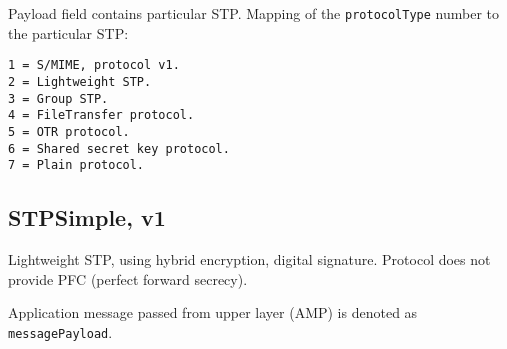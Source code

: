 \documentclass[a4paper,10pt]{article}
\begin{document}
Payload field contains particular STP. Mapping of the \verb#protocolType# number to the particular STP:\\
\begin{Verbatim}[frame=single]
1 = S/MIME, protocol v1.
2 = Lightweight STP.
3 = Group STP.
4 = FileTransfer protocol.
5 = OTR protocol.
6 = Shared secret key protocol.
7 = Plain protocol.
\end{Verbatim} 

\subsection{STPSimple, v1}
Lightweight STP, using hybrid encryption, digital signature. Protocol does not provide PFC (perfect forward secrecy).

Application message passed from upper layer (AMP) is denoted as \verb#messagePayload#. 
\end{document}
